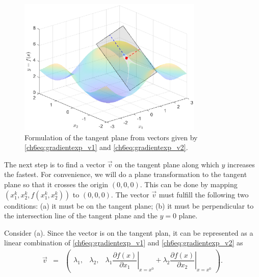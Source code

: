 \begin{figure}
	\centering
	\includegraphics[width=250pt]{chapters/part-2/figures/gradientexp_3d3.eps}
	\caption{Formulation of the tangent plane from vectors given by \eqref{ch6eq:gradientexp_v1} and \eqref{ch6eq:gradientexp_v2}.} \label{ch6fig:gradientexp_3d3}
\end{figure}

The next step is to find a vector $\vec{v}$ on the tangent plane along which $y$ increases the fastest. For convenience, we will do a plane transformation to the tangent plane so that it crosses the origin $(0,0,0)$. This can be done by mapping $\left(x_1^k,x_2^k,f(x_1^k,x_2^k)\right)$ to $(0,0,0)$. The vector $\vec{v}$ must fulfill the following two conditions: (a) it must be on the tangent plane; (b) it must be perpendicular to the intersection line of the tangent plane and the $y=0$ plane.

Consider (a). Since the vector is on the tangent plan, it can be represented as a linear combination of \eqref{ch6eq:gradientexp_v1} and \eqref{ch6eq:gradientexp_v2} as
\begin{eqnarray}
    \vec{v}&=& \left(\begin{array}{ccc}
              \lambda_1, & \lambda_2, & \lambda_1\left.\dfrac{\partial f(x)}{\partial x_1}\right|_{x=x^0} + \lambda_2\left.\dfrac{\partial f(x)}{\partial x_2}\right|_{x=x^0}
            \end{array} \right) . \label{ch6eq:gradient_v}
\end{eqnarray}


